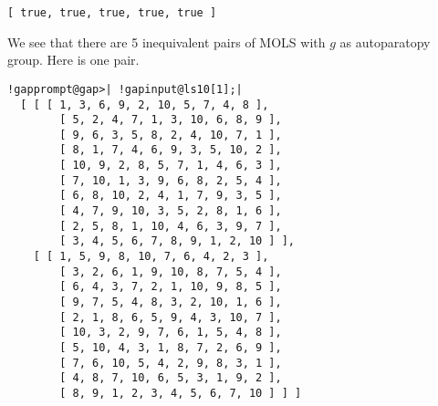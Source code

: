 \documentclass[a4paper,11pt]{report}
\begin{document}
{{\begin{Verbatim}[commandchars=!@|,fontsize=\small,frame=single,label=Example]
  [ true, true, true, true, true ]
\end{Verbatim}
 We see that there are 5 inequivalent pairs of MOLS with $g$ as autoparatopy group. Here is one pair. 
\begin{Verbatim}[commandchars=!@|,fontsize=\small,frame=single,label=Example]
  !gapprompt@gap>| !gapinput@ls10[1];|
  [ [ [ 1, 3, 6, 9, 2, 10, 5, 7, 4, 8 ], 
        [ 5, 2, 4, 7, 1, 3, 10, 6, 8, 9 ], 
        [ 9, 6, 3, 5, 8, 2, 4, 10, 7, 1 ], 
        [ 8, 1, 7, 4, 6, 9, 3, 5, 10, 2 ], 
        [ 10, 9, 2, 8, 5, 7, 1, 4, 6, 3 ], 
        [ 7, 10, 1, 3, 9, 6, 8, 2, 5, 4 ], 
        [ 6, 8, 10, 2, 4, 1, 7, 9, 3, 5 ], 
        [ 4, 7, 9, 10, 3, 5, 2, 8, 1, 6 ], 
        [ 2, 5, 8, 1, 10, 4, 6, 3, 9, 7 ], 
        [ 3, 4, 5, 6, 7, 8, 9, 1, 2, 10 ] ], 
    [ [ 1, 5, 9, 8, 10, 7, 6, 4, 2, 3 ], 
        [ 3, 2, 6, 1, 9, 10, 8, 7, 5, 4 ], 
        [ 6, 4, 3, 7, 2, 1, 10, 9, 8, 5 ], 
        [ 9, 7, 5, 4, 8, 3, 2, 10, 1, 6 ], 
        [ 2, 1, 8, 6, 5, 9, 4, 3, 10, 7 ], 
        [ 10, 3, 2, 9, 7, 6, 1, 5, 4, 8 ], 
        [ 5, 10, 4, 3, 1, 8, 7, 2, 6, 9 ], 
        [ 7, 6, 10, 5, 4, 2, 9, 8, 3, 1 ], 
        [ 4, 8, 7, 10, 6, 5, 3, 1, 9, 2 ], 
        [ 8, 9, 1, 2, 3, 4, 5, 6, 7, 10 ] ] ]
\end{Verbatim}
 }

 
}
\end{document}
